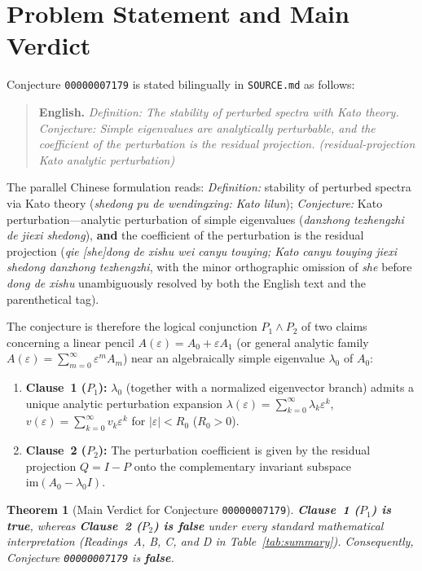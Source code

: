 \documentclass[11pt,a4paper]{article}
\newtheorem{theorem}{Theorem}[section]
\theoremstyle{definition}
\newcommand{\im}{\mathrm{im}}
\begin{document}
\section{Problem Statement and Main Verdict}

Conjecture \texttt{00000007179} is stated bilingually in \texttt{SOURCE.md} as follows:
\begin{quote}
\textbf{English.} \emph{Definition: The stability of perturbed spectra with Kato theory.
Conjecture: Simple eigenvalues are analytically perturbable, and the coefficient of the
perturbation is the residual projection. (residual-projection Kato analytic perturbation)}
\end{quote}
The parallel Chinese formulation reads: \emph{Definition:} stability of perturbed
spectra via Kato theory (\emph{shedong pu de wendingxing: Kato lilun});
\emph{Conjecture:} Kato perturbation---analytic perturbation of simple eigenvalues
(\emph{danzhong tezhengzhi de jiexi shedong}), \textbf{and} the coefficient of the
perturbation is the residual projection (\emph{qie [she]dong de xishu wei canyu
touying; Kato canyu touying jiexi shedong danzhong tezhengzhi}, with the minor
orthographic omission of \emph{she} before \emph{dong de xishu} unambiguously resolved
by both the English text and the parenthetical tag).

The conjecture is therefore the logical conjunction $P_1 \land P_2$ of two claims
concerning a linear pencil $A(\varepsilon) = A_0 + \varepsilon A_1$ (or general
analytic family $A(\varepsilon) = \sum_{m=0}^\infty \varepsilon^m A_m$) near an
algebraically simple eigenvalue $\lambda_0$ of $A_0$:
\begin{enumerate}
  \item \textbf{Clause~1 ($P_1$):} $\lambda_0$ (together with a normalized eigenvector
  branch) admits a unique analytic perturbation expansion $\lambda(\varepsilon) =
  \sum_{k=0}^\infty \lambda_k \varepsilon^k$, $v(\varepsilon) = \sum_{k=0}^\infty v_k
  \varepsilon^k$ for $|\varepsilon| < R_0$ ($R_0 > 0$).
  \item \textbf{Clause~2 ($P_2$):} The perturbation coefficient is given by the
  residual projection $Q = I - P$ onto the complementary invariant subspace
  $\im(A_0 - \lambda_0 I)$.
\end{enumerate}

\begin{theorem}[Main Verdict for Conjecture \texttt{00000007179}]\label{thm:verdict}
\textbf{Clause~1 ($P_1$) is true}, whereas \textbf{Clause~2 ($P_2$) is false} under
every standard mathematical interpretation (Readings~A, B, C, and D in
Table~\ref{tab:summary}). Consequently, Conjecture \texttt{00000007179} is
\textbf{false}.
\end{theorem}
\end{document}
